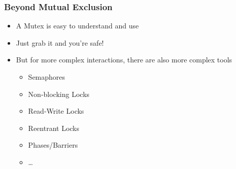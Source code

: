 \documentclass[aspectratio=169,listings,handout]{beamer}
\def\rtem{\item[\faCaretRight]}
\begin{document}
\begin{frame}
	\frametitle{Beyond Mutual Exclusion}
	\begin{itemize}[<+(1)->]
		\item A Mutex is easy to understand and use
		\rtem Just grab it and you're safe!\par\bigskip
		\item But for more complex interactions, there are also more complex tools
		\begin{itemize}
			\item Semaphores
			\item Non-blocking Locks%
			\item Read-Write Locks
			\item Reentrant Locks%
			\item Phases/Barriers
			\item\ldots
		\end{itemize}
	\end{itemize}
\end{frame}
\end{document}
